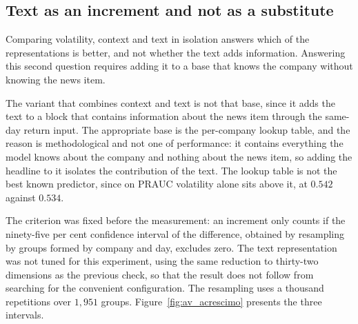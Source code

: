 \subsection{Text as an increment and not as a substitute}
\label{sec:av_acrescimo}

Comparing volatility, context and text in isolation answers which of the representations is better,
and not whether the text adds information. Answering this second question requires adding it to a
base that knows the company without knowing the news item.

The variant that combines context and text is not that base, since it adds the text to a block
that contains information about the news item through the same-day return input. The appropriate
base is the per-company lookup table, and the reason is methodological and not one of performance:
it contains everything the model knows about the company and nothing about the news item, so adding
the headline to it isolates the contribution of the text. The lookup table is not the best known
predictor, since on \gls{PRAUC} volatility alone sits above it, at $0.542$ against $0.534$.

The criterion was fixed before the measurement: an increment only counts if the ninety-five per
cent confidence interval of the difference, obtained by resampling by groups formed by company and
day, excludes zero. The text representation was not tuned for this experiment, using the same
reduction to thirty-two dimensions as the previous check, so that the result does not follow from
searching for the convenient configuration. The resampling uses a thousand repetitions over
$1{,}951$ groups. Figure~\ref{fig:av_acrescimo} presents the three intervals.

